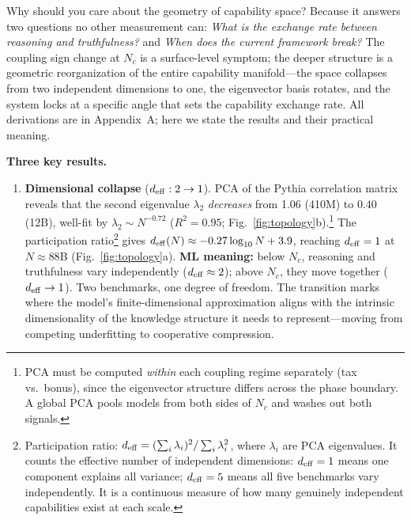 \documentclass[11pt]{article}
\begin{document}
Why should you care about the geometry of capability space?
Because it answers two questions no other measurement can: \emph{What is the exchange rate between reasoning and truthfulness?} and \emph{When does the current framework break?}
The coupling sign change at $N_c$ is a surface-level symptom; the deeper structure is a geometric reorganization of the entire capability manifold---the space collapses from two independent dimensions to one, the eigenvector basis rotates, and the system locks at a specific angle that sets the capability exchange rate.
All derivations are in Appendix~A; here we state the results and their practical meaning.

\textbf{Three key results.}
\begin{enumerate}[leftmargin=*,itemsep=2pt]
\item \textbf{Dimensional collapse} ($d_{\rm eff}: 2 \to 1$).
PCA of the Pythia correlation matrix reveals that the second eigenvalue $\lambda_2$ \emph{decreases} from 1.06 (410M) to 0.40 (12B), well-fit by $\lambda_2 \sim N^{-0.72}$ ($R^2 = 0.95$; Fig.~\ref{fig:topology}b).\footnote{PCA must be computed \emph{within} each coupling regime separately (tax vs.\ bonus), since the eigenvector structure differs across the phase boundary. A global PCA pools models from both sides of $N_c$ and washes out both signals.}
The participation ratio\footnote{Participation ratio: $d_{\rm eff} = (\sum_i \lambda_i)^2/\sum_i \lambda_i^2$, where $\lambda_i$ are PCA eigenvalues. It counts the effective number of independent dimensions: $d_{\rm eff}=1$ means one component explains all variance; $d_{\rm eff}=5$ means all five benchmarks vary independently. It is a continuous measure of how many genuinely independent capabilities exist at each scale.} gives $d_{\rm eff}(N) \approx -0.27\log_{10}N + 3.9$, reaching $d_{\rm eff} = 1$ at $N \approx 88$B (Fig.~\ref{fig:topology}a).
\textbf{ML meaning:} below $N_c$, reasoning and truthfulness vary independently ($d_{\rm eff} \approx 2$); above $N_c$, they move together ($d_{\rm eff} \to 1$). Two benchmarks, one degree of freedom.
The transition marks where the model's finite-dimensional approximation aligns with the intrinsic dimensionality of the knowledge structure it needs to represent---moving from competing underfitting to cooperative compression.


\end{enumerate}
\end{document}
